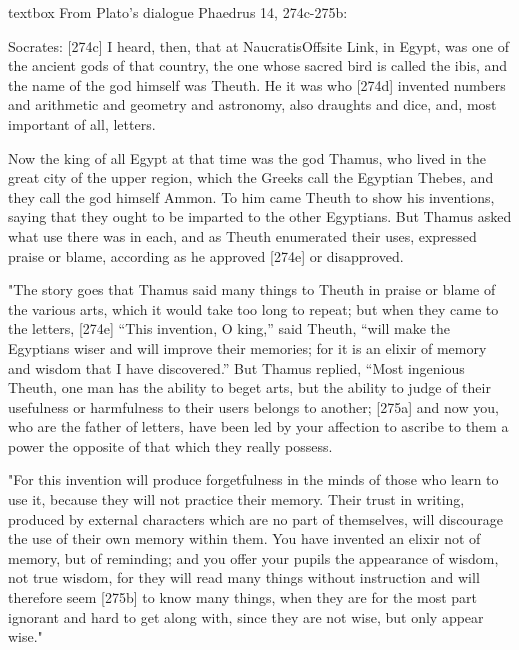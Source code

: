 \begin{table}[b]
\begin{scriptexample}[]{textbox}
From Plato's dialogue Phaedrus 14, 274c-275b:

Socrates: [274c] I heard, then, that at NaucratisOffsite Link, in Egypt, was one of the ancient gods of that country, the one whose sacred bird is called the ibis, and the name of the god himself was Theuth. He it was who [274d] invented numbers and arithmetic and geometry and astronomy, also draughts and dice, and, most important of all, letters. 

Now the king of all Egypt at that time was the god Thamus, who lived in the great city of the upper region, which the Greeks call the Egyptian Thebes, and they call the god himself Ammon. To him came Theuth to show his inventions, saying that they ought to be imparted to the other Egyptians. But Thamus asked what use there was in each, and as Theuth enumerated their uses, expressed praise or blame, according as he approved [274e] or disapproved.  

"The story goes that Thamus said many things to Theuth in praise or blame of the various arts, which it would take too long to repeat; but when they came to the letters, [274e] “This invention, O king,” said Theuth, “will make the Egyptians wiser and will improve their memories; for it is an elixir of memory and wisdom that I have discovered.” But Thamus replied, “Most ingenious Theuth, one man has the ability to beget arts, but the ability to judge of their usefulness or harmfulness to their users belongs to another; [275a] and now you, who are the father of letters, have been led by your affection to ascribe to them a power the opposite of that which they really possess.  

"For this invention will produce forgetfulness in the minds of those who learn to use it, because they will not practice their memory. Their trust in writing, produced by external characters which are no part of themselves, will discourage the use of their own memory within them. You have invented an elixir not of memory, but of reminding; and you offer your pupils the appearance of wisdom, not true wisdom, for they will read many things without instruction and will therefore seem [275b] to know many things, when they are for the most part ignorant and hard to get along with, since they are not wise, but only appear wise." 
\end{scriptexample}
\end{table}





